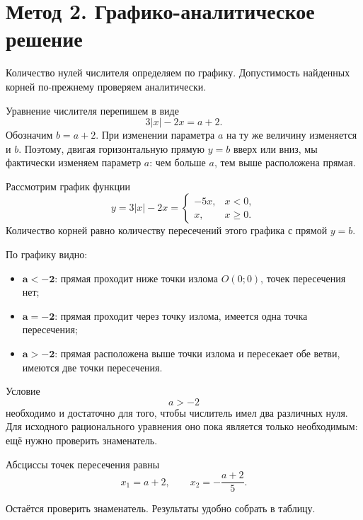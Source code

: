 \section{Метод 2. Графико-аналитическое решение}

\begin{methodintro}
  Количество нулей числителя определяем по графику. Допустимость найденных
  корней по-прежнему проверяем аналитически.
\end{methodintro}

Уравнение числителя перепишем в виде
\[
  3|x|-2x=a+2.
\]
Обозначим \(b=a+2\). При изменении параметра \(a\) на ту же величину
изменяется и \(b\). Поэтому, двигая горизонтальную прямую \(y=b\) вверх
или вниз, мы фактически изменяем параметр \(a\): чем больше \(a\), тем
выше расположена прямая.

Рассмотрим график функции
\[
  y=3|x|-2x=
  \begin{cases}
    -5x, & x<0,\\
    x, & x\ge 0.
  \end{cases}
\]
Количество корней равно количеству пересечений этого графика с прямой \(y=b\).

\parametergraphfigure

По графику видно:
\begin{itemize}
  \item \(\boldsymbol{a<-2}\): прямая проходит ниже точки излома
    \(O(0;0)\), точек пересечения нет;
  \item \(\boldsymbol{a=-2}\): прямая проходит через точку излома,
    имеется одна точка пересечения;
  \item \(\boldsymbol{a>-2}\): прямая расположена выше точки излома и
    пересекает обе ветви, имеются две точки пересечения.
\end{itemize}

\begin{conclusionbox}
  Условие
  \[
    \boxed{a>-2}
  \]
  необходимо и достаточно для того, чтобы числитель имел два различных
  нуля. Для исходного рационального уравнения оно пока является только
  необходимым: ещё нужно проверить знаменатель.

  Абсциссы точек пересечения равны
  \[
    x_1=a+2,
    \qquad
    x_2=-\frac{a+2}{5}.
  \]
\end{conclusionbox}

Остаётся проверить знаменатель. Результаты удобно собрать в таблицу.

